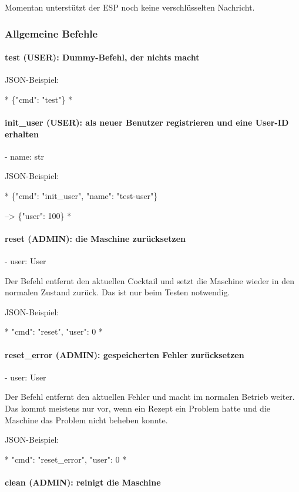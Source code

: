 Momentan unterstützt der ESP noch keine verschlüsselten Nachricht.

\subsubsection{ Allgemeine Befehle}

\paragraph{ test (USER): Dummy-Befehl, der nichts macht}

JSON-Beispiel:

*
\{"cmd": "test"\}
*

\paragraph{ init\_user (USER): als neuer Benutzer registrieren und eine User-ID erhalten}

- name: str

JSON-Beispiel:

*
\{"cmd": "init\_user", "name": "test-user"\}

--> \{"user": 100\}
*

\paragraph{ reset (ADMIN): die Maschine zurücksetzen}

- user: User

Der Befehl entfernt den aktuellen Cocktail und setzt die Maschine wieder in den normalen Zustand zurück. Das ist nur beim Testen notwendig.

JSON-Beispiel:

*
{"cmd": "reset", "user": 0}
*

\paragraph{ reset\_error (ADMIN): gespeicherten Fehler zurücksetzen}

- user: User

Der Befehl entfernt den aktuellen Fehler und macht im normalen Betrieb weiter. Das kommt meistens nur vor, wenn ein Rezept ein Problem hatte und die Maschine das Problem nicht beheben konnte.

JSON-Beispiel:

*
{"cmd": "reset\_error", "user": 0}
*

\paragraph{ clean (ADMIN): reinigt die Maschine}

